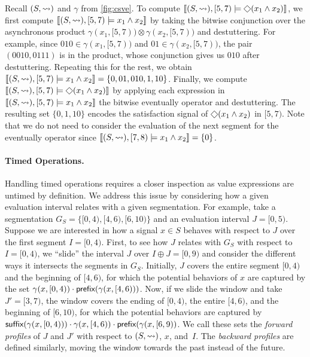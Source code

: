 \begin{example}
	Recall $(S, {\rightsquigarrow})$ and $\gamma$ from \cref{fig:csve}.
	To compute $\llbracket (S, {\hb}), [5,7) \models \LTLeventually(x_1 \land x_2) \rrbracket$, we first compute $\llbracket (S, {\rightsquigarrow}), [5,7) \models x_1 \land x_2 \rrbracket$ by taking the bitwise conjunction over the asynchronous product $\gamma(x_1, [5,7)) \otimes \gamma(x_2, [5,7))$ and destuttering.
	For example, since $010 \in \gamma(x_1, [5,7))$ and $01 \in \gamma(x_2, [5,7))$, the pair $(0010,0111)$ is in the product, whose conjunction gives us $010$ after destuttering. 
	Repeating this for the rest, we obtain $\llbracket (S, {\rightsquigarrow}), [5,7) \models x_1 \land x_2 \rrbracket = \{ 0, 01, 010, 1, 10 \}$.
	Finally, we compute $\llbracket (S, {\hb}), [5,7) \models \LTLeventually(x_1 \land x_2) \rrbracket$ by applying each expression in $\llbracket (S, {\rightsquigarrow}), [5,7) \models x_1 \land x_2 \rrbracket$ the bitwise eventually operator and destuttering.
	The resulting set $\{0, 1, 10\}$ encodes the satisfaction signal of $\LTLeventually(x_1 \land x_2)$ in $[5,7)$.
	Note that we do not need to consider the evaluation of the next segment for the eventually operator since $\llbracket (S, {\rightsquigarrow}), [7,8) \models x_1 \land x_2 \rrbracket = \{0\}$.
\end{example}

\paragraph*{Timed Operations.}
Handling timed operations requires a closer inspection as value expressions are untimed by definition.
We address this issue by considering how a given evaluation interval relates with a given segmentation.
For example, take a segmentation $G_S = \{ [0,4), [4,6), [6,10) \}$ and an evaluation interval $J = [0,5)$.
Suppose we are interested in how a signal $x \in S$ behaves with respect to $J$ over the first segment $I = [0,4)$.
First, to see how $J$ relates with $G_S$ with respect to $I =[0,4)$, we  ``slide'' the interval $J$ over $I \oplus J = [0,9)$ and consider the different ways it intersects the segments in $G_S$.
Initially, $J$ covers the entire segment $[0,4)$ and the beginning of $[4,6)$, for which the potential behaviors of $x$ are captured by the set $\gamma(x, [0,4)) \cdot \textsf{prefix}(\gamma(x, [4,6)))$.
Now, if we slide the window and take $J' = [3,7)$, the window covers the ending of $[0,4)$, the entire $[4,6)$, and the beginning of $[6,10)$, for which the potential behaviors are captured by $\textsf{suffix}(\gamma(x, [0,4))) \cdot \gamma(x, [4,6)) \cdot \textsf{prefix}(\gamma(x, [6,9))$.
We call these sets the \emph{forward profiles} of $J$ and $J'$ with respect to $(S,{\rightsquigarrow})$, $x$, and~$I$.
The \emph{backward profiles} are defined similarly, moving the window towards the past instead of the future.

